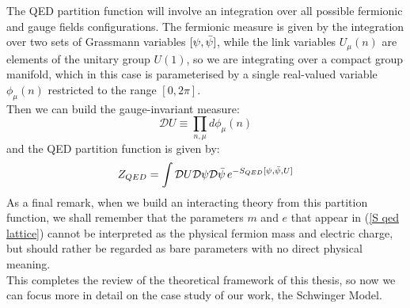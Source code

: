 The QED partition function will involve an integration over all possible fermionic and gauge fields configurations. The fermionic measure is given by the integration over two sets of Grassmann variables $[\psi, \Bar{\psi}]$, while the link variables $U_\mu(n)$ are elements of the unitary group $U(1)$, so we are integrating over a compact group manifold, which in this case is parameterised by a single real-valued variable $\phi_\mu(n)$ restricted to the range $[0, 2\pi]$. \\ Then we can build the gauge-invariant measure:
\begin{equation}
    \mathcal{D}U \equiv \prod_{n, \mu} d\phi_\mu(n)
\end{equation}
and the QED partition function is given by:
\begin{equation}
    Z_{QED} = \int \mathcal{D}U \mathcal{D}\psi \mathcal{D}\Bar{\psi} \, e^{-S_{QED}[\psi, \Bar{\psi}, U]}
\end{equation}
As a final remark, when we build an interacting theory from this partition function, we shall remember that the parameters $m$ and $e$ that appear in (\ref{S qed lattice}) cannot be interpreted as the physical fermion mass and electric charge, but should rather be regarded as bare parameters with no direct physical meaning.
\\ This completes the review of the theoretical framework of this thesis, so now we can focus more in detail on the case study of our work, the Schwinger Model.